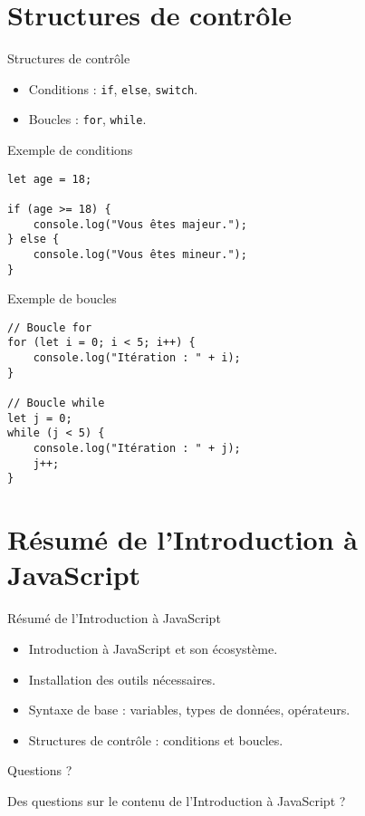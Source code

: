 \documentclass{beamer}
\begin{document}
\section{Structures de contrôle}
\begin{frame}{Structures de contrôle}
\begin{itemize}
    \item Conditions : \texttt{if}, \texttt{else}, \texttt{switch}.
    \item Boucles : \texttt{for}, \texttt{while}.
\end{itemize}
\end{frame}

\begin{frame}[fragile]{Exemple de conditions}
\begin{verbatim}
let age = 18;

if (age >= 18) {
    console.log("Vous êtes majeur.");
} else {
    console.log("Vous êtes mineur.");
}
\end{verbatim}
\end{frame}

\begin{frame}[fragile]{Exemple de boucles}
\begin{verbatim}
// Boucle for
for (let i = 0; i < 5; i++) {
    console.log("Itération : " + i);
}

// Boucle while
let j = 0;
while (j < 5) {
    console.log("Itération : " + j);
    j++;
}
\end{verbatim}
\end{frame}

\section{Résumé de l'Introduction à JavaScript}
\begin{frame}{Résumé de l'Introduction à JavaScript}
\begin{itemize}
    \item Introduction à JavaScript et son écosystème.
    \item Installation des outils nécessaires.
    \item Syntaxe de base : variables, types de données, opérateurs.
    \item Structures de contrôle : conditions et boucles.
\end{itemize}
\end{frame}

\begin{frame}{Questions ?}
\begin{center}
\Large Des questions sur le contenu de l'Introduction à JavaScript ?
\end{center}
\end{frame}
\end{document}
